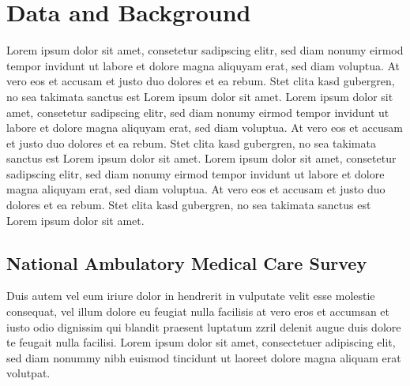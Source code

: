 \chapter{Data and Background}
Lorem ipsum dolor sit amet, consetetur sadipscing elitr,  sed diam nonumy eirmod
tempor invidunt ut labore et dolore magna aliquyam erat, sed diam voluptua. At
vero eos et accusam et justo duo dolores et ea rebum. Stet clita kasd gubergren,
no sea takimata sanctus est Lorem ipsum dolor sit amet. Lorem ipsum dolor sit
amet, consetetur sadipscing elitr,  sed diam nonumy eirmod tempor invidunt ut
labore et dolore magna aliquyam erat, sed diam voluptua. At vero eos et accusam
et justo duo dolores et ea rebum. Stet clita kasd gubergren, no sea takimata
sanctus est Lorem ipsum dolor sit amet. Lorem ipsum dolor sit amet, consetetur
sadipscing elitr,  sed diam nonumy eirmod tempor invidunt ut labore et dolore
magna aliquyam erat, sed diam voluptua. At vero eos et accusam et justo duo
dolores et ea rebum. Stet clita kasd gubergren, no sea takimata sanctus est
Lorem ipsum dolor sit amet.

\section{National Ambulatory Medical Care Survey}
Duis autem vel eum iriure dolor in hendrerit in vulputate velit esse molestie
consequat, vel illum dolore eu feugiat nulla facilisis at vero eros et accumsan
et iusto odio dignissim qui blandit praesent luptatum zzril delenit augue duis
dolore te feugait nulla facilisi. Lorem ipsum dolor sit amet, consectetuer
adipiscing elit, sed diam nonummy nibh euismod tincidunt ut laoreet dolore
magna aliquam erat volutpat.

